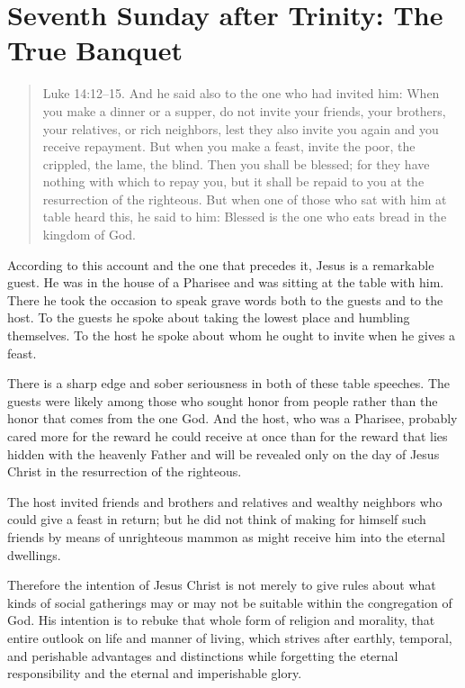 
\section{Seventh Sunday after Trinity: The True Banquet}


\begin{quote}

Luke 14:12–15. And he said also to the one who had invited him: When you make a dinner or a supper, do not invite your friends, your brothers, your relatives, or rich neighbors, lest they also invite you again and you receive repayment. But when you make a feast, invite the poor, the crippled, the lame, the blind. Then you shall be blessed; for they have nothing with which to repay you, but it shall be repaid to you at the resurrection of the righteous. But when one of those who sat with him at table heard this, he said to him: Blessed is the one who eats bread in the kingdom of God.

\end{quote}

\bigskip


According to this account and the one that precedes it, Jesus is a remarkable guest. He was in the house of a Pharisee and was sitting at the table with him. There he took the occasion to speak grave words both to the guests and to the host. To the guests he spoke about taking the lowest place and humbling themselves. To the host he spoke about whom he ought to invite when he gives a feast.

There is a sharp edge and sober seriousness in both of these table speeches. The guests were likely among those who sought honor from people rather than the honor that comes from the one God. And the host, who was a Pharisee, probably cared more for the reward he could receive at once than for the reward that lies hidden with the heavenly Father and will be revealed only on the day of Jesus Christ in the resurrection of the righteous.

The host invited friends and brothers and relatives and wealthy neighbors who could give a feast in return; but he did not think of making for himself such friends by means of unrighteous mammon as might receive him into the eternal dwellings.

Therefore the intention of Jesus Christ is not merely to give rules about what kinds of social gatherings may or may not be suitable within the congregation of God. His intention is to rebuke that whole form of religion and morality, that entire outlook on life and manner of living, which strives after earthly, temporal, and perishable advantages and distinctions while forgetting the eternal responsibility and the eternal and imperishable glory.

